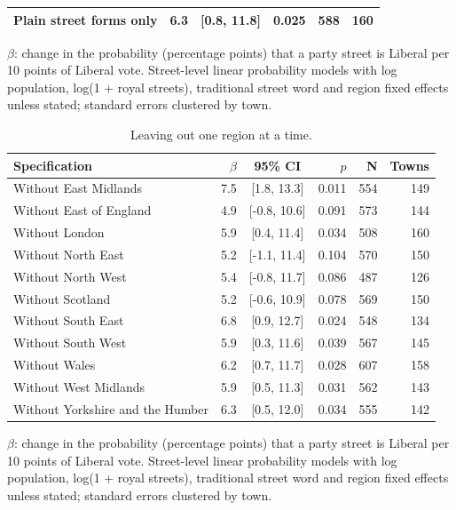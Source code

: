 \documentclass[11pt,a4paper]{article}
\begin{document}
\begin{table}[tbp]
\begin{threeparttable}
\begin{tabular}{p{7.2cm}rcrrr}
Plain street forms only & 6.3 & [0.8, 11.8] & 0.025 & 588 & 160\\
\bottomrule\end{tabular}\begin{tablenotes}\footnotesize\item $\beta$: change in the probability (percentage points) that a party street is Liberal per 10 points of Liberal vote. Street-level linear probability models with log population, log(1 + royal streets), traditional street word and region fixed effects unless stated; standard errors clustered by town.\end{tablenotes}\end{threeparttable}\end{table}

\begin{table}[tbp]\centering\footnotesize\begin{threeparttable}\caption{Leaving out one region at a time.}\label{tab:loro}\begin{tabular}{p{7.2cm}rcrrr}\toprule Specification & $\beta$ & 95\% CI & $p$ & N & Towns\\\midrule
Without East Midlands & 7.5 & [1.8, 13.3] & 0.011 & 554 & 149\\
Without East of England & 4.9 & [-0.8, 10.6] & 0.091 & 573 & 144\\
Without London & 5.9 & [0.4, 11.4] & 0.034 & 508 & 160\\
Without North East & 5.2 & [-1.1, 11.4] & 0.104 & 570 & 150\\
Without North West & 5.4 & [-0.8, 11.7] & 0.086 & 487 & 126\\
Without Scotland & 5.2 & [-0.6, 10.9] & 0.078 & 569 & 150\\
Without South East & 6.8 & [0.9, 12.7] & 0.024 & 548 & 134\\
Without South West & 5.9 & [0.3, 11.6] & 0.039 & 567 & 145\\
Without Wales & 6.2 & [0.7, 11.7] & 0.028 & 607 & 158\\
Without West Midlands & 5.9 & [0.5, 11.3] & 0.031 & 562 & 143\\
Without Yorkshire and the Humber & 6.3 & [0.5, 12.0] & 0.034 & 555 & 142\\
\bottomrule\end{tabular}\begin{tablenotes}\footnotesize\item $\beta$: change in the probability (percentage points) that a party street is Liberal per 10 points of Liberal vote. Street-level linear probability models with log population, log(1 + royal streets), traditional street word and region fixed effects unless stated; standard errors clustered by town.\end{tablenotes}\end{threeparttable}\end{table}
\end{document}

